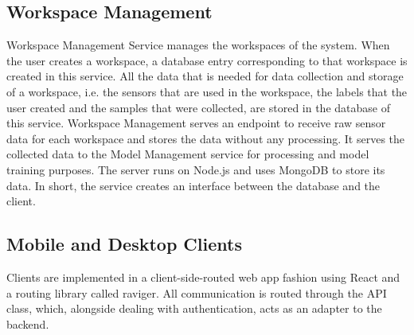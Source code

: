 \subsection{Workspace Management}
Workspace Management Service manages the workspaces of the system. When the user creates a workspace, a database entry
corresponding to that workspace is created in this service. All the data that is needed for data collection and storage
of a workspace, i.e. the sensors that are used in the workspace, the labels that the user created and the samples that were collected,
are stored in the database of this service. Workspace Management serves an endpoint to receive raw sensor data for each
workspace and stores the data without any processing. It serves the collected data to the Model Management service for
processing and model training purposes. The server runs on Node.js and uses MongoDB to store its data. In short,
the service creates an interface between the database and the client.

\subsection{Mobile and Desktop Clients}
Clients are implemented in a client-side-routed web app fashion using React and a routing library called raviger. All communication is routed through the API class, which, alongside dealing with authentication, acts as an adapter to the backend.
